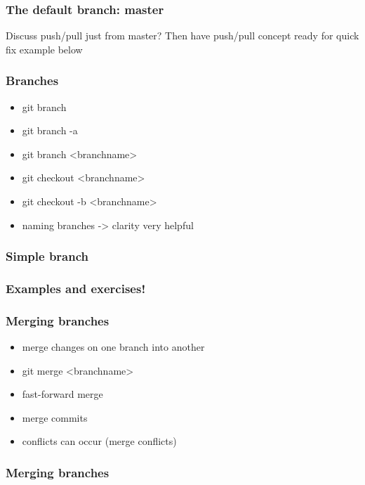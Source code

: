 \documentclass{git_course}
\begin{document}
\begin{frame}
\frametitle{The default branch: master}

Discuss push/pull just from master?  Then have push/pull concept ready
for quick fix example below
\end{frame}

\begin{frame}
\frametitle{Branches}
\begin{itemize}
    \item git branch
    \item git branch -a
    \item git branch <branchname>
    \item git checkout <branchname>
    \item git checkout -b <branchname>
    \item naming branches -> clarity very helpful
\end{itemize}
\end{frame}

\begin{frame}
\frametitle{Simple branch}
\begin{center}
    \resizebox{!}{0.7\textheight}{%
        
    }
\end{center}
\end{frame}

\begin{frame}
\frametitle{Examples and exercises!}
\end{frame}

\begin{frame}
\frametitle{Merging branches}
\begin{itemize}
    \item merge changes on one branch into another
    \item git merge <branchname>
    \item fast-forward merge
    \item merge commits
    \item conflicts can occur (merge conflicts)
\end{itemize}
\end{frame}

\begin{frame}
\frametitle{Merging branches}
\begin{center}
    \resizebox{!}{0.7\textheight}{%
        
    }
\end{center}
\end{frame}
\end{document}
